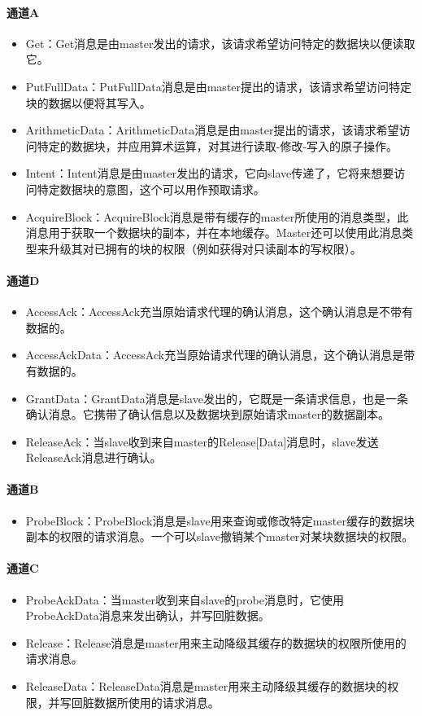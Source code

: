 \begin{center}
\paragraph{通道A}
\begin{itemize}
	\item Get：Get消息是由master发出的请求，该请求希望访问特定的数据块以便读取它。
	\item PutFullData：PutFullData消息是由master提出的请求，该请求希望访问特定块的数据以便将其写入。
	\item ArithmeticData：ArithmeticData消息是由master提出的请求，该请求希望访问特定的数据块，并应用算术运算，对其进行读取-修改-写入的原子操作。
	\item Intent：Intent消息是由master发出的请求，它向slave传递了，它将来想要访问特定数据块的意图，这个可以用作预取请求。
    \item AcquireBlock：AcquireBlock消息是带有缓存的master所使用的消息类型，此消息用于获取一个数据块的副本，并在本地缓存。Master还可以使用此消息类型来升级其对已拥有的块的权限（例如获得对只读副本的写权限）。
\end{itemize}

\paragraph{通道D}
\begin{itemize}
	\item AccessAck：AccessAck充当原始请求代理的确认消息，这个确认消息是不带有数据的。
	\item AccessAckData：AccessAck充当原始请求代理的确认消息，这个确认消息是带有数据的。
	\item GrantData：GrantData消息是slave发出的，它既是一条请求信息，也是一条确认消息。它携带了确认信息以及数据块到原始请求master的数据副本。
	\item ReleaseAck：当slave收到来自master的Release[Data]消息时，slave发送ReleaseAck消息进行确认。
\end{itemize}

\paragraph{通道B}
\begin{itemize}
	\item ProbeBlock：ProbeBlock消息是slave用来查询或修改特定master缓存的数据块副本的权限的请求消息。一个可以slave撤销某个master对某块数据块的权限。
\end{itemize}

\paragraph{通道C}
\begin{itemize}
	\item ProbeAckData：当master收到来自slave的probe消息时，它使用ProbeAckData消息来发出确认，并写回脏数据。
	\item Release：Release消息是master用来主动降级其缓存的数据块的权限所使用的请求消息。
	\item ReleaseData：ReleaseData消息是master用来主动降级其缓存的数据块的权限，并写回脏数据所使用的请求消息。
\end{itemize}


\end{center}
